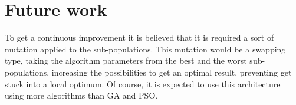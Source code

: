 \documentclass[runningheads]{llncs}
\begin{document}
\section{Future work}

To get a continuous improvement it is believed that it is required a sort of mutation applied to the sub-populations. This mutation would be a swapping type, taking the algorithm parameters from the best and the worst 
sub-populations, increasing the possibilities to get an optimal result, preventing get stuck into a local optimum.
Of course, it is expected to use this architecture using more algorithms than GA and PSO.



      
  
\end{document}
